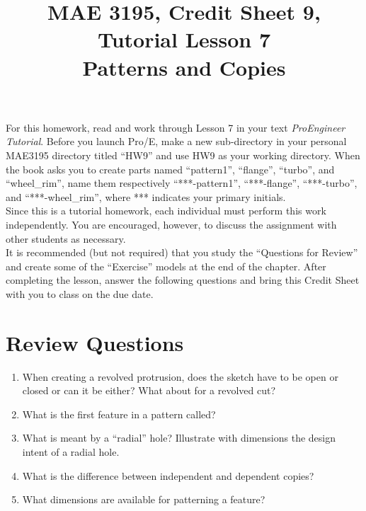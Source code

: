 \documentclass[12pt]{article}
\title{MAE 3195, Credit Sheet 9, Tutorial Lesson 7\\
Patterns and Copies}
\date{}
\begin{document}
\maketitle

For this homework, read and work through Lesson 7 in your text \textit{ProEngineer Tutorial}. Before you launch Pro/E, make a new sub-directory in your personal MAE3195 directory titled ``HW9'' and use HW9 as your working directory. When the book asks you to create parts named ``pattern1'', ``flange'', ``turbo'', and ``wheel\_rim'', name them respectively ``***-pattern1'', ``***-flange'', ``***-turbo'', and ``***-wheel\_rim'', where *** indicates your primary initials.\\

Since this is a tutorial homework, each individual must perform this work independently. You are encouraged, however, to discuss the assignment with other students as necessary.\\

It is recommended (but not required) that you study the ``Questions for Review'' and create some of the ``Exercise'' models at the end of the chapter. After completing the lesson, answer the following questions and bring this Credit Sheet with you to class on the due date.

\pagebreak

\section*{Review Questions}
\begin{enumerate}
	\item When creating a revolved protrusion, does the sketch have to be open or closed or can it be either?
What about for a revolved cut?
	\vspace{1.25in}
	\item What is the first feature in a pattern called?
	\vspace{1.25in}
	\item What is meant by a ``radial'' hole? Illustrate with dimensions the design intent of a radial hole.
	\vspace{2in}
	\item What is the difference between independent and dependent copies?
	\vspace{1.25in}
	\item What dimensions are available for patterning a feature?
\end{enumerate}
\end{document}
